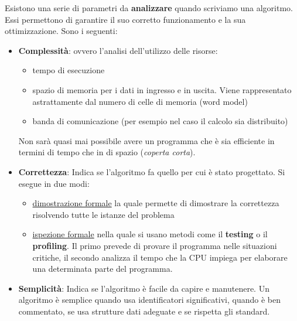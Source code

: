 \hspace{-15pt}Esistono una serie di parametri da \textbf{analizzare} quando scriviamo una algoritmo. Essi permettono di garantire il suo corretto funzionamento e la sua ottimizzazione. Sono i seguenti:
\begin{itemize}
    \item \textbf{Complessità}: ovvero l'analisi dell'utilizzo delle risorse: 
    \begin{itemize}
    	\item tempo di esecuzione
    	\item spazio di memoria per i dati in ingresso e in uscita. Viene rappresentato astrattamente dal numero di celle di memoria (word model)
    	\item banda di comunicazione (per esempio nel caso il calcolo sia distribuito)
    \end{itemize}
	Non sarà quasi mai possibile avere un programma che è sia efficiente in termini di tempo che in di spazio (\emph{coperta corta}).
    \item \textbf{Correttezza}: Indica se l'algoritmo fa quello per cui è stato progettato. Si esegue in due modi:
    \begin{itemize}
    	\item \underline{dimostrazione formale} la quale permette di dimostrare la correttezza risolvendo tutte le istanze del problema
    	\item \underline{ispezione formale} nella quale si usano metodi come il \textbf{testing} o il \textbf{profiling}. Il primo prevede di provare il programma nelle situazioni critiche, il secondo analizza il tempo che la CPU impiega per elaborare una determinata parte del programma.
    \end{itemize}
    \item \textbf{Semplicità}: Indica se l'algoritmo è facile da capire e manutenere. Un algoritmo è semplice quando usa identificatori significativi, quando è ben commentato, se usa strutture dati adeguate e se rispetta gli standard.
\end{itemize}

